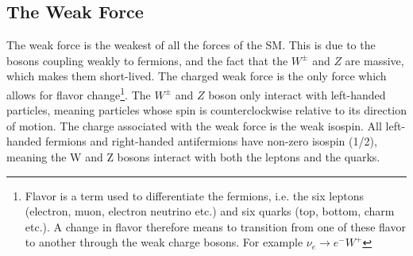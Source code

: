 \subsection{The Weak Force}
The weak force is the weakest of all the forces of the \ac{SM}. This is due to the bosons 
coupling weakly to fermions, and the fact that the $W^{\pm}$ and $Z$ are massive, which makes them short-lived. 
The charged weak force is the only force which allows for flavor change\footnote{Flavor is a term used to differentiate the 
fermions, i.e. the six leptons (electron, muon, electron neutrino etc.) and six quarks (top, bottom, charm etc.).
A change in flavor therefore means to transition from one of these flavor to another through the weak 
charge bosons. For example $\nu_e \rightarrow e^{-}W^+$ }. The $W^{\pm}$ and $Z$ boson only interact with left-handed particles, meaning particles 
whose spin is counterclockwise relative to its direction of motion. The charge associated with the weak force is the weak isospin. 
All left-handed fermions and right-handed antifermions have non-zero isospin (1/2), meaning the W and Z bosons interact with 
both the leptons and the quarks.  